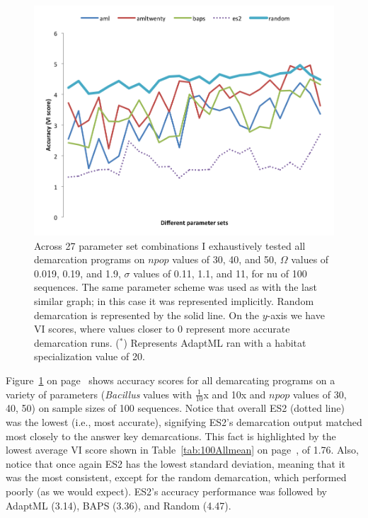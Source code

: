\begin{figure}[h!]
  \centering
    \includegraphics[scale=0.75]{images/ResultGraphs/ResultGraphs-2}
      \caption[All demarcation graphical accuracy visualization on $nu = 100$.]{Across 27 parameter set combinations I exhaustively tested all demarcation programs on $npop$ values of 30, 40, and 50, $\Omega$ values of 0.019, 0.19, and 1.9, $\sigma$ values of 0.11, 1.1, and 11, for nu of 100 sequences. The same parameter scheme was used as with the last similar graph; in this case it was represented implicitly. Random demarcation is represented by the solid line. On the $y$-axis we have VI scores, where values closer to 0 represent more accurate demarcation runs.  ($^\ast$) Represents AdaptML ran with a habitat specialization value of 20.}
    \label{fig:All100}
\end{figure}

Figure~\ref{fig:All100} on page~\pageref{fig:All100} shows accuracy scores for all demarcating programs on a variety of parameters (\emph{Bacillus} values with $\frac{1}{10}$x and 10x and $npop$ values of 30, 40, 50) on sample sizes of 100 sequences.
Notice that overall ES2 (dotted line) was the lowest (i.e., most accurate), signifying ES2's demarcation output matched most closely to the answer key demarcations.
This fact is highlighted by the lowest average VI score shown in Table~\ref{tab:100Allmean} on page~\pageref{tab:100Allmean}, of 1.76.
Also, notice that once again ES2 has the lowest standard deviation, meaning that it was the most consistent, except for the random demarcation, which performed poorly (as we would expect).
ES2's accuracy performance was followed by AdaptML (3.14), BAPS (3.36), and Random (4.47).

